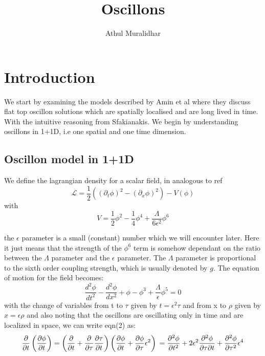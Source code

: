 \documentclass{article}
\begin{document}
\title{Oscillons}
\author{Athul Muralidhar}

\maketitle

\section{Introduction}
\par We start by examining the models described by Amin et al\cite{amin} where they discuss flat top oscillon solutions which are spatially localised and are long lived in time. With the intuitive reasoning from Sfakianakis\cite{evan}. We begin by understanding oscillons in 1+1D, i.e one spatial and one time dimension.
\subsection{Oscillon model in 1+1D}
We define the lagrangian density for a scalar field, in analogous to ref\cite{evan}
\begin{equation}
\mathcal{L} = \frac{1}{2}((\partial_{t}\phi)^{2}-(\partial_{x}\phi)^{2}) - V(\phi)
\end{equation}
with $$V=\frac{1}{2} \phi^{2}-\frac{1}{4}\phi^{4}+\frac{\Lambda}{6\epsilon^{2}}\phi^{6}$$
\par the $\epsilon$ parameter is a small (constant) number which we will encounter later. Here it just means that the strength of the $\phi^{6}$ term is somehow dependant on the ratio between the $\Lambda$ parameter and the $\epsilon$ parameter. The $\Lambda$ parameter is proportional to the sixth order coupling strength, which is usually denoted by $g$. The equation of motion for the field becomes:
\begin{equation}
\frac{d^{2}\phi}{dt^{2}} - \frac{d^{2}\phi}{dx^{2}} + \phi - \phi^{3} + \frac{\Lambda}{\epsilon}\phi^{5} = 0
\end{equation}
with the change of variables from t to $\tau$ given by $t = \epsilon^{2}\tau$ and from x to $\rho$ given by $x = \epsilon \rho$ and also noting that the oscillons are oscillating only in time and are localized in space, we can write eqn(2) as:
\begin{equation}
\frac{\partial}{\partial t} \left(\frac{\partial \phi}{\partial t}\right) = \left(\frac{\partial}{\partial t}+\frac{\partial}{\partial \tau}\frac{\partial \tau}{\partial t}\right)\left(\frac{\partial \phi}{\partial t} + \frac{\partial \phi}{\partial \tau} \epsilon^{2}\right) \\
=\frac{\partial^{2} \phi}{\partial t^{2}} + 2\epsilon^{2} \frac{\partial^{2} \phi}{\partial \tau \partial t} + \frac{\partial^{2} \phi}{\partial \tau^{2}} \epsilon^{4}
\end{equation}
\end{document}
